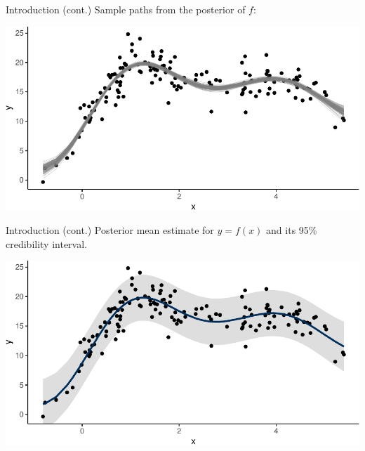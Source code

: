 \documentclass[,aspectratio=43]{beamer}
\begin{document}
\begin{frame}{Introduction (cont.)}
\protect\hypertarget{introduction-cont.-2}{}
Sample paths from the posterior of \(f\):

\vspace{1em}

\includegraphics{figure/postsamp-1.pdf}
\end{frame}

\begin{frame}{Introduction (cont.)}
\protect\hypertarget{introduction-cont.-3}{}
Posterior mean estimate for \(y=f(x)\) and its 95\% credibility
interval.

\vspace{1em}

\includegraphics{figure/ipriorplot-1.pdf}
\end{frame}
\end{document}
